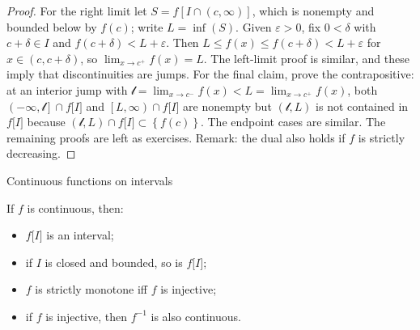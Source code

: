 \begin{proof}

For the right limit let \(S = f\left\lbrack {I \cap \left( {c,\infty} \right)} \right\rbrack\), which is nonempty and bounded below by \(f(c)\); write \(L = \inf(S)\). Given \(\varepsilon > 0\), fix \(0 < \delta\) with \(c + \delta \in I\) and \(f\left( {c + \delta} \right) < L + \varepsilon\). Then \(L \leq f(x) \leq f\left( {c + \delta} \right) < L + \varepsilon\) for \(x \in \left( {c,c + \delta} \right)\), so \(\lim_{x\rightarrow c^{+}}f(x) = L\). The left-limit proof is similar, and these imply that discontinuities are jumps. For the final claim, prove the contrapositive: at an interior jump with \(\mathcal{l} = \lim_{x\rightarrow c^{-}}f(x) < L = \lim_{x\rightarrow c^{+}}f(x)\), both \(\left( {- \infty,\mathcal{l}} \right\rbrack \cap f\lbrack I\rbrack\) and \(\left\lbrack {L,\infty} \right) \cap f\lbrack I\rbrack\) are nonempty but \(\left( {\mathcal{l},L} \right)\) is not contained in \(f\lbrack I\rbrack\) because \(\left( {\mathcal{l},L} \right) \cap f\lbrack I\rbrack \subset \left\{ {f(c)} \right\}\). The endpoint cases are similar. The remaining proofs are left as exercises. Remark: the dual also holds if \(f\) is strictly decreasing.

\end{proof}

\begin{theorem}{Continuous functions on intervals}

If \(f\) is continuous, then:

\begin{itemize}
\tightlist
\item
  \(f\lbrack I\rbrack\) is an interval;
\item
  if \(I\) is closed and bounded, so is \(f\lbrack I\rbrack\);
\item
  \(f\) is strictly monotone iff \(f\) is injective;
\item
  if \(f\) is injective, then \(f^{- 1}\) is also continuous.
\end{itemize}

\end{theorem}

